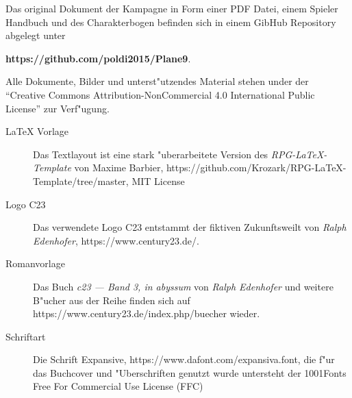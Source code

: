 \newpage
\pagestyle{empty}



Das original  Dokument der Kampagne in Form einer PDF Datei, einem Spieler Handbuch und des Charakterbogen 
befinden sich in einem GibHub Repository abgelegt unter 

\textbf{https://github.com/poldi2015/Plane9}. 

Alle Dokumente, Bilder und unterst"utzendes Material stehen under der ``Creative Commons Attribution-NonCommercial 4.0 
International Public License'' zur Verf"ugung.


\begin{description}
    \item [LaTeX Vorlage] Das Textlayout ist eine stark "uberarbeitete Version des \textit{RPG-LaTeX-Template} von 
        Maxime Barbier, https://github.com/Krozark/RPG-LaTeX-Template/tree/master, MIT License
    \item [Logo C23] Das verwendete Logo C23 entstammt der fiktiven Zukunftsweilt von \emph{Ralph  Edenhofer}, 
        \newline{}https://www.century23.de/.
    \item [Romanvorlage] Das Buch \emph{c23 --- Band 3, in abyssum} von \emph{Ralph  Edenhofer} und weitere B"ucher aus der Reihe finden 
        sich auf https://www.century23.de/index.php/buecher wieder.
    \item [Schriftart] Die Schrift Expansive, https://www.dafont.com/expansiva.font, die f"ur das Buchcover und 
        "Uberschriften genutzt wurde untersteht der 1001Fonts Free For Commercial Use License (FFC)    
\end{description}